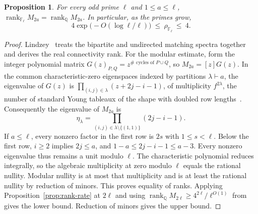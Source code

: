 \documentclass[11pt]{article}
\newtheorem{proposition}[theorem]{Proposition}
\theoremstyle{definition}
\newcommand{\rank}{\operatorname{rank}}
\begin{document}
\begin{proposition}\label{prop:rank-primes}
For every odd prime \(\ell\) and \(1\le a\le\ell\),
\(\rank_{\mathbb F_\ell}M_{2a}=\rank_{\mathbb Q}M_{2a}\).
In particular, as the primes grow,
\[
       4\exp\!\bigl(-O(\log\ell/\ell)\bigr)
            \ \le\ \rho_{\mathbb F_\ell}\ \le\ 4 .
\]
\end{proposition}
\begin{proof}
Lindzey~\cite{lindzey-thesis} treats the bipartite and undirected matching spectra together and derives the real connectivity rank. For the modular estimate, form the integer polynomial matrix \(G(z)_{P,Q}=z^{\#\text{ cycles of }P\cup Q}\), so \(M_{2a}=[z]G(z)\). In the common characteristic-zero eigenspaces indexed by partitions \(\lambda\vdash a\), the eigenvalue of \(G(z)\) is \(\prod_{(i,j)\in\lambda}(z+2j-i-1)\), of multiplicity \(f^{2\lambda}\), the number of standard Young tableaux of the shape with doubled row lengths~\cite[Sections~3--4]{collins-matsumoto}. Consequently the eigenvalue of \(M_{2a}\) is
\[
       \eta_\lambda=\prod_{(i,j)\in\lambda\setminus\{(1,1)\}}(2j-i-1).
\]
If \(a\le\ell\), every nonzero factor in the first row is \(2s\) with \(1\le s<\ell\). Below the first row, \(i\ge2\) implies \(2j\le a\), and \(1-a\le 2j-i-1\le a-3\). Every nonzero eigenvalue thus remains a unit modulo \(\ell\). The characteristic polynomial reduces integrally, so the algebraic multiplicity at zero modulo \(\ell\) equals the rational nullity. Modular nullity is at most that multiplicity and is at least the rational nullity by reduction of minors. This proves equality of ranks. Applying Proposition~\ref{prop:rank-rate} at \(2\ell\) and using \(\rank_{\mathbb Q} M_{2\ell}\ge 4^{2\ell}/\ell^{O(1)}\) from~\cite[Section~4]{cln} gives the lower bound. Reduction of minors gives the upper bound.
\end{proof}
\end{document}
